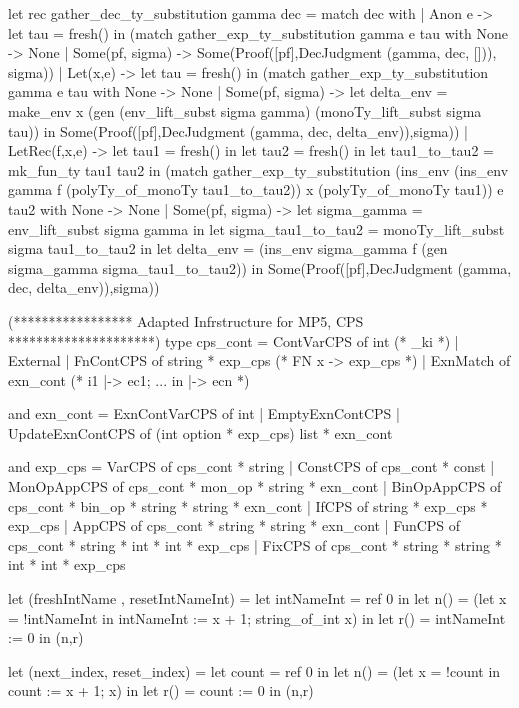 let rec gather_dec_ty_substitution gamma dec =
    match dec with 
    | Anon e ->
      let tau = fresh() in
      (match gather_exp_ty_substitution gamma e tau
	with None -> None
	   | Some(pf, sigma) ->
             Some(Proof([pf],DecJudgment (gamma, dec, [])), sigma))
    | Let(x,e) -> 
       let tau = fresh() in
       (match gather_exp_ty_substitution gamma e tau
	with None -> None
	   | Some(pf, sigma) -> 
	      let delta_env = make_env x (gen (env_lift_subst sigma gamma) 
					      (monoTy_lift_subst sigma tau)) in
             Some(Proof([pf],DecJudgment (gamma, dec, delta_env)),sigma))
    | LetRec(f,x,e) ->
       let tau1  = fresh() in
       let tau2 = fresh() in
       let tau1_to_tau2 = mk_fun_ty tau1 tau2 in
       (match gather_exp_ty_substitution
		(ins_env (ins_env gamma f (polyTy_of_monoTy tau1_to_tau2))
			  x (polyTy_of_monoTy tau1))
		e tau2
	with None -> None
	   | Some(pf, sigma) -> 
              let sigma_gamma = env_lift_subst sigma gamma in
	      let sigma_tau1_to_tau2 = monoTy_lift_subst sigma tau1_to_tau2 in
              let delta_env =
                 (ins_env sigma_gamma f (gen sigma_gamma sigma_tau1_to_tau2))
              in 
	      Some(Proof([pf],DecJudgment (gamma, dec, delta_env)),sigma))

(***************** Adapted Infrstructure for MP5, CPS *********************)
type cps_cont = 
   ContVarCPS of int                   (* _ki *)
 | External
 | FnContCPS of string * exp_cps       (* FN x -> exp_cps *)
 | ExnMatch of exn_cont                (* i1 |-> ec1; ... in |-> ecn *)

and exn_cont =
   ExnContVarCPS of int
 | EmptyExnContCPS
 | UpdateExnContCPS of (int option * exp_cps) list * exn_cont

and exp_cps =
   VarCPS of cps_cont * string
 | ConstCPS of cps_cont * const
 | MonOpAppCPS of cps_cont * mon_op * string * exn_cont
 | BinOpAppCPS of cps_cont * bin_op * string * string * exn_cont
 | IfCPS of string * exp_cps * exp_cps
 | AppCPS of cps_cont * string * string * exn_cont
 | FunCPS of cps_cont * string * int * int * exp_cps
 | FixCPS of cps_cont * string * string * int * int * exp_cps 

let (freshIntName , resetIntNameInt) =
    let intNameInt = ref 0 in
    let n() = (let x = !intNameInt in intNameInt := x + 1; string_of_int x) in
    let r() = intNameInt := 0 in
    (n,r)

let (next_index, reset_index) = 
    let count = ref 0 in
    let n() = (let x = !count in count := x + 1; x) in
    let r() = count := 0 in
    (n,r)

